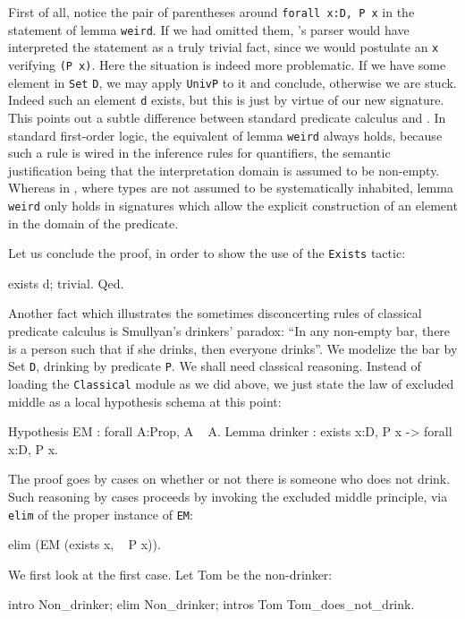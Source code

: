 \documentclass[11pt,a4paper]{book}
\begin{document}
First of all, notice the pair of parentheses around
\verb+forall x:D, P x+ in
the statement of lemma \verb:weird:.
If we had omitted them, \Coq's parser would have interpreted the
statement as a truly trivial fact, since we would 
postulate an \verb:x: verifying \verb:(P x):. Here the situation is indeed
more problematic. If we have some element in \verb:Set: \verb:D:, we may
apply \verb:UnivP: to it and conclude, otherwise we are stuck. Indeed
such an element \verb:d: exists, but this is just by virtue of our
new signature. This points out a subtle difference between standard
predicate calculus and \Coq. In standard first-order logic,
the equivalent of lemma \verb:weird: always holds, 
because such a rule is wired in the inference rules for quantifiers, the
semantic justification being that the interpretation domain is assumed to
be non-empty. Whereas in \Coq, where types are not assumed to be 
systematically inhabited, lemma \verb:weird: only holds in signatures
which allow the explicit construction of an element in the domain of
the predicate. 

Let us conclude the proof, in order to show the use of the \verb:Exists:
tactic:
\begin{coq_example}
exists d; trivial.
Qed.
\end{coq_example}

Another fact which illustrates the sometimes disconcerting rules of
classical 
predicate calculus is Smullyan's drinkers' paradox: ``In any non-empty
bar, there is a person such that if she drinks, then everyone drinks''.
We modelize the bar by Set \verb:D:, drinking by predicate \verb:P:.
We shall need classical reasoning. Instead of loading the \verb:Classical:
module as we did above, we just state the law of excluded middle as a
local hypothesis schema at this point:
\begin{coq_example}
Hypothesis EM : forall A:Prop, A \/ ~ A.
Lemma drinker :  exists x:D, P x -> forall x:D, P x.
\end{coq_example}
The proof goes by cases on whether or not
there is someone who does not drink. Such reasoning by cases proceeds
by invoking the excluded middle principle, via \verb:elim: of the
proper instance of \verb:EM::
\begin{coq_example}
elim (EM (exists x, ~ P x)).
\end{coq_example}

We first look at the first case. Let Tom be the non-drinker:
\begin{coq_example}
intro Non_drinker; elim Non_drinker;
  intros Tom Tom_does_not_drink.
\end{coq_example}
\end{document}
